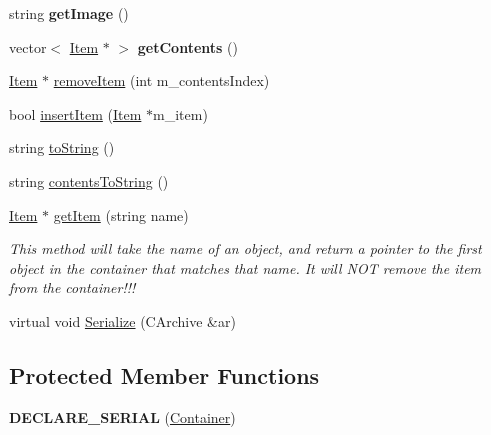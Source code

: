 \begin{DoxyCompactItemize}
string {\bfseries get\+Image} ()
\item 
\hypertarget{class_container_a2215a87d003e88bab9a86a97a69448ac}{}\label{class_container_a2215a87d003e88bab9a86a97a69448ac} 
vector$<$ \hyperlink{class_item}{Item} $\ast$ $>$ {\bfseries get\+Contents} ()
\item 
\hyperlink{class_item}{Item} $\ast$ \hyperlink{class_container_a8b203900fe9babebd7e744e34321962c}{remove\+Item} (int m\+\_\+contents\+Index)
\item 
bool \hyperlink{class_container_a512e6e65360249dc2fcd1aa5f466a01e}{insert\+Item} (\hyperlink{class_item}{Item} $\ast$m\+\_\+item)
\item 
string \hyperlink{class_container_a2bedbb656854553ca7d22e9212a628fc}{to\+String} ()
\item 
string \hyperlink{class_container_ab00aa23e1f650444e153301a7a247116}{contents\+To\+String} ()
\item 
\hyperlink{class_item}{Item} $\ast$ \hyperlink{class_container_a0a7c5bb0533b6a28ae6b5f0736d75d30}{get\+Item} (string name)
\begin{DoxyCompactList}\small\item\em This method will take the name of an object, and return a pointer to the first object in the container that matches that name. It will N\+OT remove the item from the container!!! \end{DoxyCompactList}\item 
virtual void \hyperlink{class_container_ac274312989a3c896c3d764e2d315dfb7}{Serialize} (C\+Archive \&ar)
\end{DoxyCompactItemize}
\subsection*{Protected Member Functions}
\begin{DoxyCompactItemize}
\item 
\hypertarget{class_container_a7b52c4e148c15a81d2190467a13d3caa}{}\label{class_container_a7b52c4e148c15a81d2190467a13d3caa} 
{\bfseries D\+E\+C\+L\+A\+R\+E\+\_\+\+S\+E\+R\+I\+AL} (\hyperlink{class_container}{Container})
\end{DoxyCompactItemize}
